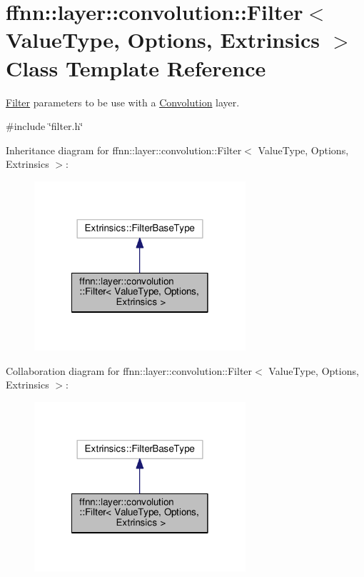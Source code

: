 \hypertarget{classffnn_1_1layer_1_1convolution_1_1_filter}{\section{ffnn\-:\-:layer\-:\-:convolution\-:\-:Filter$<$ Value\-Type, Options, Extrinsics $>$ Class Template Reference}
\label{classffnn_1_1layer_1_1convolution_1_1_filter}
}


\hyperlink{classffnn_1_1layer_1_1convolution_1_1_filter}{Filter} parameters to be use with a \hyperlink{classffnn_1_1layer_1_1_convolution}{Convolution} layer.  




{\ttfamily \#include \char`\"{}filter.\-h\char`\"{}}



Inheritance diagram for ffnn\-:\-:layer\-:\-:convolution\-:\-:Filter$<$ Value\-Type, Options, Extrinsics $>$\-:\nopagebreak
\begin{figure}[H]
\begin{center}
\leavevmode
\includegraphics[width=222pt]{classffnn_1_1layer_1_1convolution_1_1_filter__inherit__graph}
\end{center}
\end{figure}


Collaboration diagram for ffnn\-:\-:layer\-:\-:convolution\-:\-:Filter$<$ Value\-Type, Options, Extrinsics $>$\-:\nopagebreak
\begin{figure}[H]
\begin{center}
\leavevmode
\includegraphics[width=222pt]{classffnn_1_1layer_1_1convolution_1_1_filter__coll__graph}
\end{center}
\end{figure}
